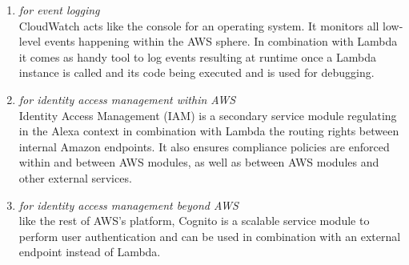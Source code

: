 \begin{enumerate}
	\item[\href{https://aws.amazon.com/iam/}{\textbf{CloudWatch}} \footnote{\url{https://aws.amazon.com/cloudwatch}}]
	\textit{for event logging}\\
	CloudWatch acts like the console for an operating system. It monitors all low-level events happening within the AWS sphere. In combination with Lambda it comes as handy tool to log events resulting at runtime once a Lambda instance is called and its code being executed and is used for debugging.
	
	


	\item[\href{https://aws.amazon.com/iam/}{\textbf{IAM}} \footnote{\url{https://aws.amazon.com/iam}}]
	\textit{for identity access management within AWS}\\
	Identity Access Management (IAM) is a secondary service module regulating in the Alexa context in combination with Lambda the routing rights between internal Amazon endpoints. It also ensures compliance policies are enforced within and between AWS modules, as well as between AWS modules and other external services.
%	
%	


	\item[\href{https://aws.amazon.com/cognito/}{\textbf{Cognito}} \footnote{\url{https://aws.amazon.com/cognito}}]
	\textit{for identity access management beyond AWS}\\
	like the rest of AWS's platform, Cognito is a scalable service module to perform user authentication and can be used in combination with an external endpoint instead of Lambda.
	
	
\end{enumerate}

